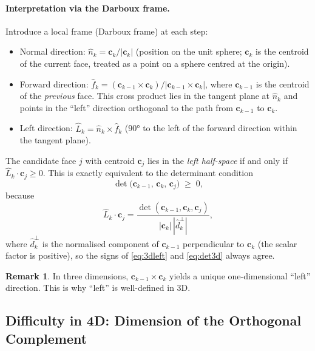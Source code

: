 \documentclass[12pt,a4paper]{article}
\theoremstyle{definition}
\newtheorem{remark}{Remark}[section]
\begin{document}
\paragraph{Interpretation via the Darboux frame.}
Introduce a local frame (Darboux frame) at each step:
\begin{itemize}
  \item Normal direction:
    $\hat{n}_k = \mathbf{c}_k / |\mathbf{c}_k|$
    (position on the unit sphere; $\mathbf{c}_k$ is the centroid of the
     current face, treated as a point on a sphere centred at the origin).
  \item Forward direction:
    $\hat{f}_k = (\mathbf{c}_{k-1} \times \mathbf{c}_k) /
                  |\mathbf{c}_{k-1} \times \mathbf{c}_k|$,
    where $\mathbf{c}_{k-1}$ is the centroid of the \emph{previous} face.
    This cross product lies in the tangent plane at $\hat{n}_k$ and points
    in the ``left'' direction orthogonal to the path from $\mathbf{c}_{k-1}$
    to $\mathbf{c}_k$.
  \item Left direction:
    $\hat{L}_k = \hat{n}_k \times \hat{f}_k$
    (90° to the left of the forward direction within the tangent plane).
\end{itemize}

The candidate face $j$ with centroid $\mathbf{c}_j$ lies in the
\emph{left half-space} if and only if $\hat{L}_k \cdot \mathbf{c}_j \ge 0$.
This is exactly equivalent to the determinant condition
\begin{equation}
  \det\!\bigl(\mathbf{c}_{k-1},\, \mathbf{c}_k,\, \mathbf{c}_j\bigr) \;\ge\; 0,
  \label{eq:det3d}
\end{equation}
because
\[
  \hat{L}_k \cdot \mathbf{c}_j
  = \frac{\det(\mathbf{c}_{k-1}, \mathbf{c}_k, \mathbf{c}_j)}
         {|\mathbf{c}_k|\,|\hat{d}_k^\perp|},
\]
where $\hat{d}_k^\perp$ is the normalised component of
$\mathbf{c}_{k-1}$ perpendicular to $\mathbf{c}_k$
(the scalar factor is positive), so the signs of
\eqref{eq:3dleft} and \eqref{eq:det3d} always agree.

\begin{remark}
  In three dimensions, $\mathbf{c}_{k-1} \times \mathbf{c}_k$ yields a
  unique one-dimensional ``left'' direction.
  This is why ``left'' is well-defined in 3D.
\end{remark}

\subsection{Difficulty in 4D: Dimension of the Orthogonal Complement}
\end{document}
